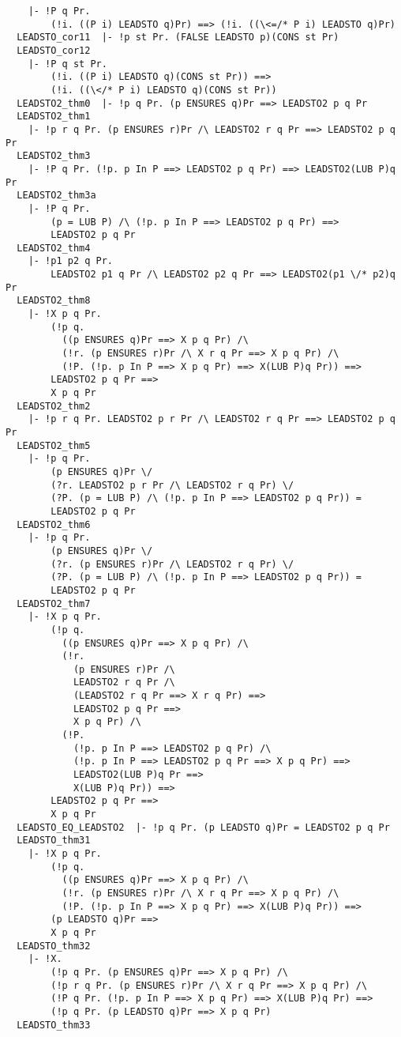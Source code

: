 {\begin{verbatim}
    |- !P q Pr.
        (!i. ((P i) LEADSTO q)Pr) ==> (!i. ((\<=/* P i) LEADSTO q)Pr)
  LEADSTO_cor11  |- !p st Pr. (FALSE LEADSTO p)(CONS st Pr)
  LEADSTO_cor12
    |- !P q st Pr.
        (!i. ((P i) LEADSTO q)(CONS st Pr)) ==>
        (!i. ((\</* P i) LEADSTO q)(CONS st Pr))
  LEADSTO2_thm0  |- !p q Pr. (p ENSURES q)Pr ==> LEADSTO2 p q Pr
  LEADSTO2_thm1
    |- !p r q Pr. (p ENSURES r)Pr /\ LEADSTO2 r q Pr ==> LEADSTO2 p q Pr
  LEADSTO2_thm3
    |- !P q Pr. (!p. p In P ==> LEADSTO2 p q Pr) ==> LEADSTO2(LUB P)q Pr
  LEADSTO2_thm3a
    |- !P q Pr.
        (p = LUB P) /\ (!p. p In P ==> LEADSTO2 p q Pr) ==>
        LEADSTO2 p q Pr
  LEADSTO2_thm4
    |- !p1 p2 q Pr.
        LEADSTO2 p1 q Pr /\ LEADSTO2 p2 q Pr ==> LEADSTO2(p1 \/* p2)q Pr
  LEADSTO2_thm8
    |- !X p q Pr.
        (!p q.
          ((p ENSURES q)Pr ==> X p q Pr) /\
          (!r. (p ENSURES r)Pr /\ X r q Pr ==> X p q Pr) /\
          (!P. (!p. p In P ==> X p q Pr) ==> X(LUB P)q Pr)) ==>
        LEADSTO2 p q Pr ==>
        X p q Pr
  LEADSTO2_thm2
    |- !p r q Pr. LEADSTO2 p r Pr /\ LEADSTO2 r q Pr ==> LEADSTO2 p q Pr
  LEADSTO2_thm5
    |- !p q Pr.
        (p ENSURES q)Pr \/
        (?r. LEADSTO2 p r Pr /\ LEADSTO2 r q Pr) \/
        (?P. (p = LUB P) /\ (!p. p In P ==> LEADSTO2 p q Pr)) =
        LEADSTO2 p q Pr
  LEADSTO2_thm6
    |- !p q Pr.
        (p ENSURES q)Pr \/
        (?r. (p ENSURES r)Pr /\ LEADSTO2 r q Pr) \/
        (?P. (p = LUB P) /\ (!p. p In P ==> LEADSTO2 p q Pr)) =
        LEADSTO2 p q Pr
  LEADSTO2_thm7
    |- !X p q Pr.
        (!p q.
          ((p ENSURES q)Pr ==> X p q Pr) /\
          (!r.
            (p ENSURES r)Pr /\
            LEADSTO2 r q Pr /\
            (LEADSTO2 r q Pr ==> X r q Pr) ==>
            LEADSTO2 p q Pr ==>
            X p q Pr) /\
          (!P.
            (!p. p In P ==> LEADSTO2 p q Pr) /\
            (!p. p In P ==> LEADSTO2 p q Pr ==> X p q Pr) ==>
            LEADSTO2(LUB P)q Pr ==>
            X(LUB P)q Pr)) ==>
        LEADSTO2 p q Pr ==>
        X p q Pr
  LEADSTO_EQ_LEADSTO2  |- !p q Pr. (p LEADSTO q)Pr = LEADSTO2 p q Pr
  LEADSTO_thm31
    |- !X p q Pr.
        (!p q.
          ((p ENSURES q)Pr ==> X p q Pr) /\
          (!r. (p ENSURES r)Pr /\ X r q Pr ==> X p q Pr) /\
          (!P. (!p. p In P ==> X p q Pr) ==> X(LUB P)q Pr)) ==>
        (p LEADSTO q)Pr ==>
        X p q Pr
  LEADSTO_thm32
    |- !X.
        (!p q Pr. (p ENSURES q)Pr ==> X p q Pr) /\
        (!p r q Pr. (p ENSURES r)Pr /\ X r q Pr ==> X p q Pr) /\
        (!P q Pr. (!p. p In P ==> X p q Pr) ==> X(LUB P)q Pr) ==>
        (!p q Pr. (p LEADSTO q)Pr ==> X p q Pr)
  LEADSTO_thm33

\end{verbatim}}

